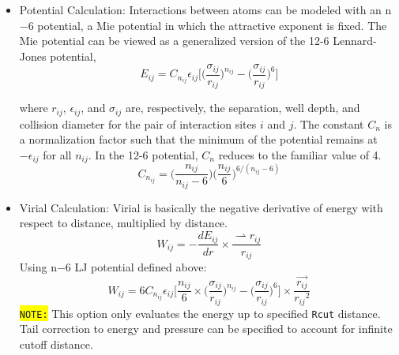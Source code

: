\begin{itemize}
	\item Potential Calculation: Interactions between atoms can be modeled with an n$-$6 potential, a Mie potential in which the attractive exponent is fixed. The Mie potential can be viewed as a generalized version of the 12-6 Lennard-Jones potential, \\
\begin{equation}
E_{ij} = C_{n_{ij}} \epsilon_{ij} \bigg[\bigg(\frac{\sigma_{ij}}{r_{ij}}\bigg)^{n_{ij}} - \bigg(\frac{\sigma_{ij}}{r_{ij}}\bigg)^6\bigg]
\end{equation}

where $r_{ij}$, $\epsilon_{ij}$, and $\sigma_{ij}$ are, respectively, the separation, well depth, and collision diameter for the pair of interaction sites $i$ and $j$. The constant $C_n$ is a normalization factor such that the minimum of the potential remains at $-\epsilon_{ij}$ for all $n_{ij}$. In the 12-6 potential, $C_n$ reduces to the familiar value of 4.
\begin{equation}
C_{n_{ij}} = \bigg(\frac{n_{ij}}{n_{ij} - 6} \bigg)\bigg(\frac{n_{ij}}{6} \bigg)^{6/(n_{ij} - 6)}
\end{equation}

	\item Virial Calculation: Virial is basically the negative derivative of energy with respect to distance, multiplied by distance.\\
\begin{equation}
W_{ij} = -\frac{dE_{ij}}{dr}\times \frac{\rightharpoonup{r_{ij}}}{r_{ij}}
\end{equation}
Using n$-$6 LJ potential defined above:
\begin{equation}
W_{ij} = 6C_{n_{ij}} \epsilon_{ij} \bigg[\frac{n_{ij}}{6} \times \bigg(\frac{\sigma_{ij}}{r_{ij}}\bigg)^{n_{ij}} - \bigg(\frac{\sigma_{ij}}{r_{ij}}\bigg)^6\bigg]\times \frac{\overrightarrow{r_{ij}}}{{r_{ij}}^2}
\end{equation}
\colorbox{yellow}{\texttt{NOTE:}} This option only evaluates the energy up to specified \texttt{Rcut} distance. Tail correction to energy and pressure can be specified to account for infinite cutoff distance.
\end{itemize}

